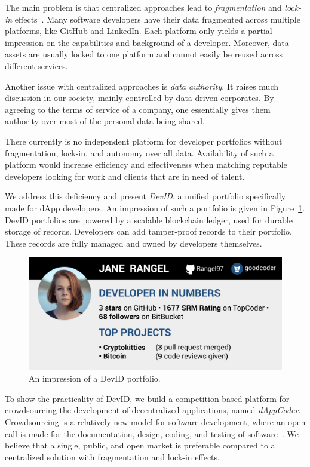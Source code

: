 The main problem is that centralized approaches lead to \emph{fragmentation} and \emph{lock-in} effects~\cite{pouwelse2017laws}.
Many software developers have their data fragmented across multiple platforms, like GitHub and LinkedIn.
Each platform only yields a partial impression on the capabilities and background of a developer.
Moreover, data assets are usually locked to one platform and cannot easily be reused across different services.

Another issue with centralized approaches is \emph{data authority}.
It raises much discussion in our society, mainly controlled by data-driven corporates.
By agreeing to the terms of service of a company, one essentially gives them authority over most of the personal data being shared.

There currently is no independent platform for developer portfolios without fragmentation, lock-in, and autonomy over all data.
Availability of such a platform would increase efficiency and effectiveness when matching reputable developers looking for work and clients that are in need of talent.

We address this deficiency and present \emph{DevID}, a unified portfolio specifically made for dApp developers.
An impression of such a portfolio is given in Figure~\ref{fig:devid}.
DevID portfolios are powered by a scalable blockchain ledger, used for durable storage of records.
Developers can add tamper-proof records to their portfolio.
These records are fully managed and owned by developers themselves.

\begin{figure}[b]
	\includegraphics[width=\columnwidth]{devid/resources/devid_smaller.jpeg}
	\caption{An impression of a DevID portfolio.}
	\label{fig:devid}
\end{figure}

To show the practicality of DevID, we build a competition-based platform for crowdsourcing the development of decentralized applications, named \emph{dAppCoder}.
Crowdsourcing is a relatively new model for software development, where an open call is made for the documentation, design, coding, and testing of software~\cite{latoza2016crowdsourcing}.
We believe that a single, public, and open market is preferable compared to a centralized solution with fragmentation and lock-in effects.

